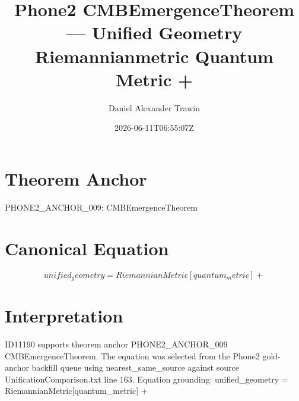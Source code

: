 \documentclass[11pt]{article}
\title{Phone2 CMBEmergenceTheorem — Unified Geometry Riemannianmetric Quantum Metric +}
\author{Daniel Alexander Trawin}
\date{2026-06-11T06:55:07Z}
\begin{document}
\maketitle
\section*{Theorem Anchor}
PHONE2_ANCHOR_009: CMBEmergenceTheorem
\section*{Canonical Equation}
\[
unified_geometry = RiemannianMetric[quantum_metric] +
\]
\section*{Interpretation}
ID11190 supports theorem anchor PHONE2_ANCHOR_009 CMBEmergenceTheorem. The equation was selected from the Phone2 gold-anchor backfill queue using nearest_same_source against source UnificationComparison.txt line 163. Equation grounding: unified_geometry = RiemannianMetric[quantum_metric] +
\end{document}
